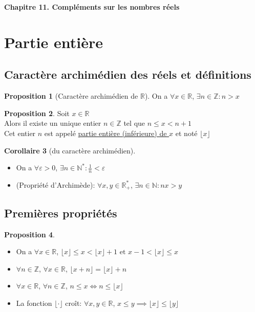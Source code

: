 \documentclass[10pt,a4paper]{article}
\theoremstyle{definition}
\newtheorem{proposition}{Proposition}[section]
\newtheorem{corollaire}[proposition]{Corollaire}
\begin{document}
\renewcommand{\labelitemi}{$*$}
\renewcommand{\labelenumi}{(\roman{enumi})}
\begin{center}
{\Large \textbf{Chapitre 11. Compléments sur les nombres réels}}
\end{center}

\section{Partie entière}
\subsection{Caractère archimédien des réels et définitions}
\begin{proposition}[Caractère archimédien de $\mathbb{R}$]
On a $\forall x \in \mathbb{R}$, $\exists n \in \mathbb{Z} : n > x$
\end{proposition}
\begin{proposition}
Soit $x \in \mathbb{R}$ \\
Alors il existe un unique entier $n \in \mathbb{Z}$ tel que $n \leq x < n + 1$ \\
Cet entier $n$ est appelé \uline{partie entière (inférieure) de $x$} et noté $\lfloor x \rfloor$
\end{proposition}
\begin{corollaire}[du caractère archimédien]
\hfill
\begin{itemize}
\item On a $\forall \varepsilon > 0$, $\exists n \in \mathbb{N}^* : \frac{1}{n} < \varepsilon$
\item (Propriété d'Archimède): $\forall x, y \in \mathbb{R}_+^*$, $\exists n \in \mathbb{N}: nx > y$
\end{itemize}
\end{corollaire}

\subsection{Premières propriétés}
\begin{proposition}
\hfill
\begin{itemize}
\item On a $\forall x \in \mathbb{R}$, $\lfloor x \rfloor \leq x < \lfloor x \rfloor + 1 \text{ et } x - 1 < \lfloor x \rfloor \leq x$
\item $\forall n \in \mathbb{Z}$, $\forall x \in \mathbb{R}$, $\lfloor x + n \rfloor = \lfloor x \rfloor + n$
\item $\forall x \in \mathbb{R}$, $\forall n \in \mathbb{Z}$, $n \leq x \iff n \leq \lfloor x \rfloor$
\item La fonction $\lfloor \cdot \rfloor$ croît: $\forall x, y \in \mathbb{R}$, $x \leq y \implies \lfloor x \rfloor \leq \lfloor y \rfloor$
\end{itemize}
\end{proposition}
\end{document}
